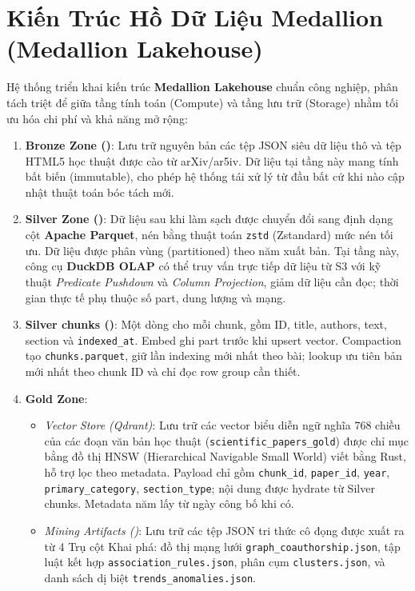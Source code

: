 \section{Kiến Trúc Hồ Dữ Liệu Medallion (Medallion Lakehouse)}

Hệ thống triển khai kiến trúc \textbf{Medallion Lakehouse} chuẩn công nghiệp, phân tách triệt để giữa tầng tính toán (Compute) và tầng lưu trữ (Storage) nhằm tối ưu hóa chi phí và khả năng mở rộng:

\begin{enumerate}[label=\textbf{\arabic*.}]
  \item \textbf{Bronze Zone ()}:
    Lưu trữ nguyên bản các tệp JSON siêu dữ liệu thô và tệp HTML5 học thuật được cào từ arXiv/ar5iv. Dữ liệu tại tầng này mang tính bất biến (immutable), cho phép hệ thống tái xử lý từ đầu bất cứ khi nào cập nhật thuật toán bóc tách mới.
  \item \textbf{Silver Zone ()}:
    Dữ liệu sau khi làm sạch được chuyển đổi sang định dạng cột \textbf{Apache Parquet}, nén bằng thuật toán \texttt{zstd} (Zstandard) mức nén tối ưu. Dữ liệu được phân vùng (partitioned) theo năm xuất bản. Tại tầng này, công cụ \textbf{DuckDB OLAP} có thể truy vấn trực tiếp dữ liệu từ S3 với kỹ thuật \textit{Predicate Pushdown} và \textit{Column Projection}, giảm dữ liệu cần đọc; thời gian thực tế phụ thuộc số part, dung lượng và mạng.
  \item \textbf{Silver chunks ()}: Một dòng cho mỗi chunk, gồm ID, title, authors, text, section và \texttt{indexed\_at}. Embed ghi part trước khi upsert vector. Compaction tạo \texttt{chunks.parquet}, giữ lần indexing mới nhất theo bài; lookup ưu tiên bản mới nhất theo chunk ID và chỉ đọc row group cần thiết.
  \item \textbf{Gold Zone}:
    \begin{itemize}
      \item \textit{Vector Store (Qdrant)}: Lưu trữ các vector biểu diễn ngữ nghĩa 768 chiều của các đoạn văn bản học thuật (\texttt{scientific\_papers\_gold}) được chỉ mục bằng đồ thị HNSW (Hierarchical Navigable Small World) viết bằng Rust, hỗ trợ lọc theo metadata. Payload chỉ gồm \texttt{chunk\_id}, \texttt{paper\_id}, \texttt{year}, \texttt{primary\_category}, \texttt{section\_type}; nội dung được hydrate từ Silver chunks. Metadata năm lấy từ ngày công bố khi có.
      \item \textit{Mining Artifacts ()}: Lưu trữ các tệp JSON tri thức cô đọng được xuất ra từ 4 Trụ cột Khai phá: đồ thị mạng lưới \texttt{graph\_coauthorship.json}, tập luật kết hợp \texttt{association\_rules.json}, phân cụm \texttt{clusters.json}, và danh sách dị biệt \texttt{trends\_anomalies.json}.
    \end{itemize}
\end{enumerate}

